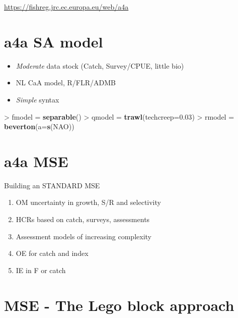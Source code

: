 \documentclass[]{article}
\newenvironment{Shaded}{\begin{snugshade}}{\end{snugshade}}
\newcommand{\KeywordTok}[1]{\textcolor[rgb]{0.13,0.29,0.53}{\textbf{{#1}}}}
\newcommand{\DataTypeTok}[1]{\textcolor[rgb]{0.13,0.29,0.53}{{#1}}}
\newcommand{\FloatTok}[1]{\textcolor[rgb]{0.00,0.00,0.81}{{#1}}}
\newcommand{\StringTok}[1]{\textcolor[rgb]{0.31,0.60,0.02}{{#1}}}
\newcommand{\NormalTok}[1]{{#1}}
\providecommand{\tightlist}{%
  \setlength{\itemsep}{0pt}\setlength{\parskip}{0pt}}
\begin{document}
\centering
\url{https://fishreg.jrc.ec.europa.eu/web/a4a}

\section{a4a SA model}\label{a4a-sa-model}

\begin{itemize}
\tightlist
\item
  \emph{Moderate} data stock (Catch, Survey/CPUE, little bio)
\item
  NL CaA model, R/FLR/ADMB
\item
  \emph{Simple} syntax
\end{itemize}

\begin{Shaded}
\begin{Highlighting}[]
\NormalTok{>}\StringTok{ }\NormalTok{fmodel =}\StringTok{ }\KeywordTok{separable}\NormalTok{()}
\NormalTok{>}\StringTok{ }\NormalTok{qmodel =}\StringTok{ }\KeywordTok{trawl}\NormalTok{(}\DataTypeTok{techcreep=}\FloatTok{0.03}\NormalTok{)}
\NormalTok{>}\StringTok{ }\NormalTok{rmodel =}\StringTok{ }\KeywordTok{beverton}\NormalTok{(}\DataTypeTok{a=}\KeywordTok{s}\NormalTok{(NAO))}
\end{Highlighting}
\end{Shaded}

\section{a4a MSE}\label{a4a-mse}

Building an STANDARD MSE

\begin{enumerate}
\def\labelenumi{\arabic{enumi}.}
\tightlist
\item
  OM uncertainty in growth, S/R and selectivity
\item
  HCRs based on catch, surveys, assessments
\item
  Assessment models of increasing complexity
\item
  OE for catch and index
\item
  IE in F or catch
\end{enumerate}

\section{MSE - The Lego block
approach}\label{mse---the-lego-block-approach}
\end{document}

